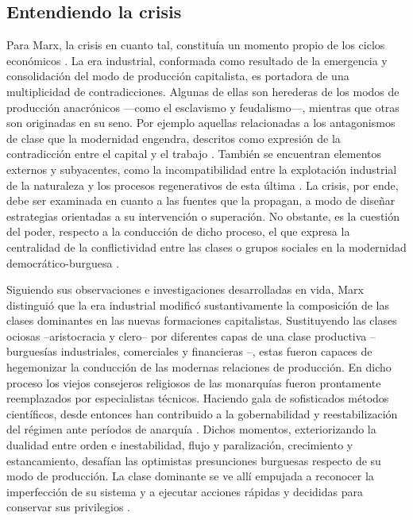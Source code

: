 \documentclass{textolivre}
\begin{document}
\subsection{Entendiendo la crisis}\label{sec-crisis}
Para Marx, la crisis en cuanto tal, constituía un momento propio de los ciclos
económicos \cite[p. 11--12]{marx2010}. La era industrial, conformada como resultado de la
emergencia y consolidación del modo de producción capitalista, es portadora de una
multiplicidad de contradicciones. Algunas de ellas son herederas de los modos de
producción anacrónicos —como el esclavismo y feudalismo—, mientras que otras son
originadas en su seno. Por ejemplo aquellas relacionadas a los antagonismos de clase
que la modernidad engendra, descritos como expresión de la contradicción entre el capital
y el trabajo \cite{wallerstein}. También se encuentran elementos
externos y subyacentes, como la incompatibilidad entre la explotación industrial de la
naturaleza y los procesos regenerativos de esta última \cite{Foster2016}. La crisis, por
ende, debe ser examinada en cuanto a las fuentes que la propagan, a modo de diseñar
estrategias orientadas a su intervención o superación. No obstante, es la cuestión del
poder, respecto a la conducción de dicho proceso, el que expresa la centralidad de la
conflictividad entre las clases o grupos sociales en la modernidad democrático-burguesa
\cite{lenin1997}.

Siguiendo sus observaciones e investigaciones desarrolladas en vida, Marx
distinguió que la era industrial modificó sustantivamente la composición de las clases
dominantes en las nuevas formaciones capitalistas. Sustituyendo las clases ociosas 
--aristocracia y clero-- por diferentes capas de una clase productiva --burguesías
industriales, comerciales y financieras \cite{marx2003}--, estas fueron capaces de
hegemonizar la conducción de las modernas relaciones de producción. En dicho proceso
los viejos consejeros religiosos de las monarquías fueron prontamente reemplazados por
especialistas técnicos. Haciendo gala de sofisticados métodos científicos, desde entonces
han contribuido a la gobernabilidad y reestabilización del régimen ante períodos de
anarquía \cite{Gunderson2019}. Dichos momentos, exteriorizando la
dualidad entre orden e inestabilidad, flujo y paralización, crecimiento y estancamiento,
desafían las optimistas presunciones burguesas respecto de su modo de producción. La
clase dominante se ve allí empujada a reconocer la imperfección de su sistema y a
ejecutar acciones rápidas y decididas para conservar sus privilegios \cite{lenin1997}.
\end{document}

